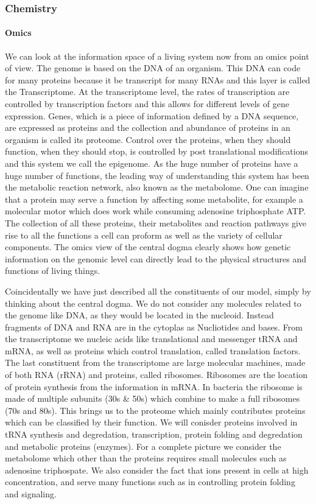 \documentclass{article}
\begin{document}
\subsubsection{Chemistry}

\paragraph{Omics}

We can look at the information space of a living system now from an omics point of view. The genome is based on the DNA of an organism. This DNA can code for many proteins because it be transcript for many RNAs and this layer is called the Transcriptome. At the transcriptome level, the rates of transcription are controlled by transcription factors and this allows for different levels of gene expression. Genes, which is a piece of information defined by a DNA sequence, are expressed as proteins and the collection and abundance of proteins in an organism is called its proteome. Control over the proteins, when they should function, when they should stop, is controlled by post translational modifications and this system we call the epigenome. As the huge number of proteins have a huge number of functions, the leading way of understanding this system has been the metabolic reaction network, also known as the metabolome. One can imagine that a protein may serve a function by affecting some metabolite, for example a molecular motor which does work while consuming adenosine triphosphate ATP. The collection of all these proteins, their metabolites and reaction pathways give rise to all the functions a cell can proform as well as the variety of cellular components. The omics view of the central dogma clearly shows how genetic information on the genomic level can directly lead to the physical structures and functions of living things.

Coincidentally we have just described all the constituents of our model, simply by thinking about the central dogma. We do not consider any molecules related to the genome like DNA, as they would be located in the nucleoid. Instead fragments of DNA and RNA are in the cytoplas as Nucliotides and bases. From the transcriptome we nucleic acids like translational and messenger tRNA and mRNA, as well as proteins which control translation, called translation factors. The last constituent from the transcriptome are large molecular machines, made of both RNA (rRNA) and proteins, called ribosomes. Ribosomes are the location of protein synthesis from the information in mRNA. In bacteria the ribosome is made of multiple subunits (30s \& 50s) which combine to make a full ribosomes (70s and 80s). This brings us to the proteome which mainly contributes proteins which can be classified by their function. We will conisder proteins involved in tRNA synthesis and degredation, transcription, protein folding and degredation and metabolic proteins (enzymes). For a complete picture we consider the metabolome which other than the proteins requires small molecules such as adenosine triphospate. We also consider the fact that ions present in cells at high concentration, and serve many functions such as in controlling protein folding and signaling.
\end{document}
